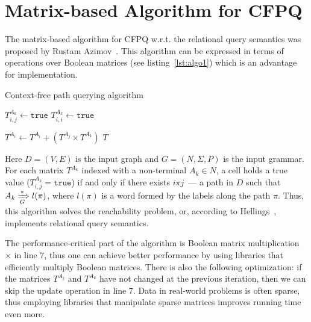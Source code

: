 \section{Matrix-based Algorithm for CFPQ}

The matrix-based algorithm for CFPQ w.r.t. the relational query semantics was proposed by Rustam Azimov~\cite{Azimov:2018:CPQ:3210259.3210264}.
This algorithm can be expressed in terms of operations over Boolean matrices (see listing~\ref{lst:algo1}) which is an advantage for implementation.
{\small
\begin{algorithm}
\begin{algorithmic}[1]
\caption{Context-free path querying algorithm}
\label{lst:algo1}
          {$T^{A_k}_{i,j} \gets \texttt{true}$}
    \EndFor
       {$T^{A_k}_{i,i} \gets \texttt{true}$}
    \EndFor

          { $T^{A_i} \gets T^{A_i} + (T^{A_j} \times T^{A_k})$ } 
        \EndFor
    \EndWhile
\State \Return $T$
\EndFunction
\end{algorithmic}
\end{algorithm}
}

Here $D = (V, E)$ is the input graph and $G = (N,\Sigma,P)$ is the input grammar.
For each matrix $T^{A_k}$ indexed with a non-terminal $A_k \in N$, a cell holds a true value ($T^{A_k}_{i,j} = \texttt{true}$) if and only if there exists $i \pi j$~--- a path in $D$ such that $A_k \xRightarrow[G]{*} l(\pi) $, where $l(\pi)$ is a word formed by the labels along the path $\pi$.
Thus, this algorithm solves the reachability problem, or, according to Hellings~\cite{hellingsRelational}, implements relational query semantics.

The performance-critical part of the algorithm is Boolean matrix multiplication $\times$ in line 7, thus one can achieve better performance by using libraries that efficiently multiply Boolean matrices. 
There is also the following optimization: if the matrices $T^{A_j}$ and $T^{A_k}$ have not changed at the previous iteration, then we can skip the update operation in line 7.
Data in real-world problems is often sparse, thus employing libraries that manipulate sparse matrices improves running time even more. 
